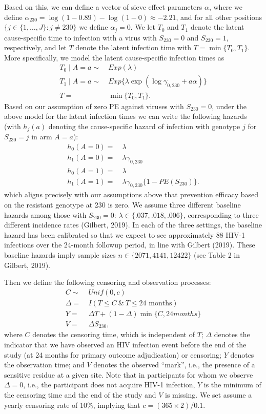 \documentclass[10pt]{article}
\begin{document}
Based on this, we can define a vector of sieve effect parameters $\alpha$, where we define $\alpha_{230} = \log(1 - 0.89) - \log(1 - 0) \approx -2.21$, and for all other positions $\{j \in \{1, \ldots, J\}: j \neq 230\}$ we define $\alpha_j = 0$. We let $T_0$ and $T_1$ denote the latent cause-specific time to infection with a virus with $S_{230} = 0$ and $S_{230} = 1$, respectively, and let $T$ denote the latent infection time with $T = \min \{T_0, T_1\}$. More specifically, we model the latent cause-specific infection times as
\begin{align*}
  T_0 \mid A = a \sim & \ Exp(\lambda) \\
  T_1 \mid A = a \sim & \ Exp\{\lambda\exp(\log \gamma_{0,230} + a \alpha)\} \\
  T =& \ \min\{T_0, T_1\}.
\end{align*}
Based on our assumption of zero PE against viruses with $S_{230} = 0$, under the above model for the latent infection times we can write the following hazards (with $h_j(a)$ denoting the cause-specific hazard of infection with genotype $j$ for $S_{230} = j$ in arm $A = a$):
\begin{align*}
  h_0(A = 0) =& \ \lambda \\
  h_1(A = 0) =& \ \lambda \gamma_{0,230} \\
  h_0(A = 1) =& \ \lambda \\
  h_1(A = 1) =& \ \lambda \gamma_{0,230} \{1 - PE(S_{230})\}.
\end{align*}
which aligns precisely with our assumptions above that prevention efficacy based on the resistant genotype at 230 is zero. We assume three different baseline hazards among those with $S_{230} = 0$: $\lambda \in \{.037, .018, .006\}$, corresponding to three different incidence rates (Gilbert, 2019). In each of the three settings, the baseline hazard has been calibrated so that we expect to see approximately 88 HIV-1 infections over the 24-month followup period, in line with Gilbert (2019). These baseline hazards imply sample sizes $n \in \{2071, 4141, 12422\}$ (see Table 2 in Gilbert, 2019).

Then we define the following censoring and observation processes:
\begin{align*}
  C \sim & \ Unif(0, c) \\
  \Delta =& \ I(T \leq C \ \& \ T \leq \text{24 months}) \\
  Y =& \ \Delta T + (1 - \Delta) \min\{C, 24 months\} \\
  V =& \ \Delta S_{230},
\end{align*}
where $C$ denotes the censoring time, which is independent of $T$; $\Delta$ denotes the indicator that we have observed an HIV infection event before the end of the study (at 24 months for primary outcome adjudication) or censoring; $Y$ denotes the observation time; and $V$ denotes the observed ``mark'', i.e., the presence of a sensitive residue at a given site. Note that in participants for whom we observe $\Delta = 0$, i.e., the participant does not acquire HIV-1 infection, $Y$ is the minimum of the censoring time and the end of the study and $V$ is missing. We set assume a yearly censoring rate of 10\%, implying that $c = (365 \times 2) / 0.1$.
\end{document}
